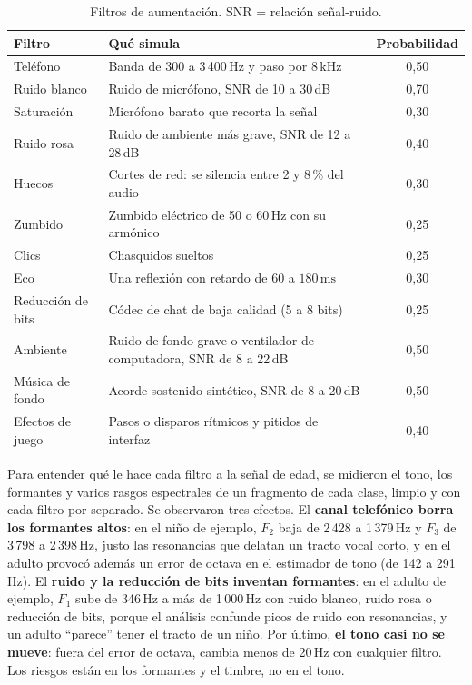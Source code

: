 \documentclass[11pt,a4paper]{article}
\begin{document}
\begin{table}[H]
\centering
\caption{Filtros de aumentación. SNR = relación señal-ruido.}
\label{tab:filtros}
\small
\begin{tabularx}{\linewidth}{@{}>{\raggedright\arraybackslash}p{2.8cm}Lc@{}}
\toprule
\textbf{Filtro} & \textbf{Qué simula} & \textbf{Probabilidad} \\
\midrule
Teléfono & Banda de 300 a 3\,400\,Hz y paso por $8\,\mathrm{kHz}$ & 0,50 \\
Ruido blanco & Ruido de micrófono, SNR de 10 a 30\,dB & 0,70 \\
Saturación & Micrófono barato que recorta la señal & 0,30 \\
Ruido rosa & Ruido de ambiente más grave, SNR de 12 a 28\,dB & 0,40 \\
Huecos & Cortes de red: se silencia entre 2 y 8\,\% del audio & 0,30 \\
Zumbido & Zumbido eléctrico de 50 o 60\,Hz con su armónico & 0,25 \\
Clics & Chasquidos sueltos & 0,25 \\
Eco & Una reflexión con retardo de $60$ a $180\,\mathrm{ms}$ & 0,30 \\
Reducción de bits & Códec de chat de baja calidad (5 a 8 bits) & 0,25 \\
Ambiente & Ruido de fondo grave o ventilador de computadora, SNR de 8 a 22\,dB & 0,50 \\
Música de fondo & Acorde sostenido sintético, SNR de 8 a 20\,dB & 0,50 \\
Efectos de juego & Pasos o disparos rítmicos y pitidos de interfaz & 0,40 \\
\bottomrule
\end{tabularx}
\end{table}

Para entender qué le hace cada filtro a la señal de edad, se midieron el tono, los formantes y varios rasgos espectrales de un fragmento de cada clase, limpio y con cada filtro por separado. Se observaron tres efectos. El \textbf{canal telefónico borra los formantes altos}: en el niño de ejemplo, $F_2$ baja de 2\,428 a 1\,379\,Hz y $F_3$ de 3\,798 a 2\,398\,Hz, justo las resonancias que delatan un tracto vocal corto, y en el adulto provocó además un error de octava en el estimador de tono (de 142 a 291\,Hz). El \textbf{ruido y la reducción de bits inventan formantes}: en el adulto de ejemplo, $F_1$ sube de 346\,Hz a más de 1\,000\,Hz con ruido blanco, ruido rosa o reducción de bits, porque el análisis confunde picos de ruido con resonancias, y un adulto ``parece'' tener el tracto de un niño. Por último, \textbf{el tono casi no se mueve}: fuera del error de octava, cambia menos de 20\,Hz con cualquier filtro. Los riesgos están en los formantes y el timbre, no en el tono.
\end{document}
